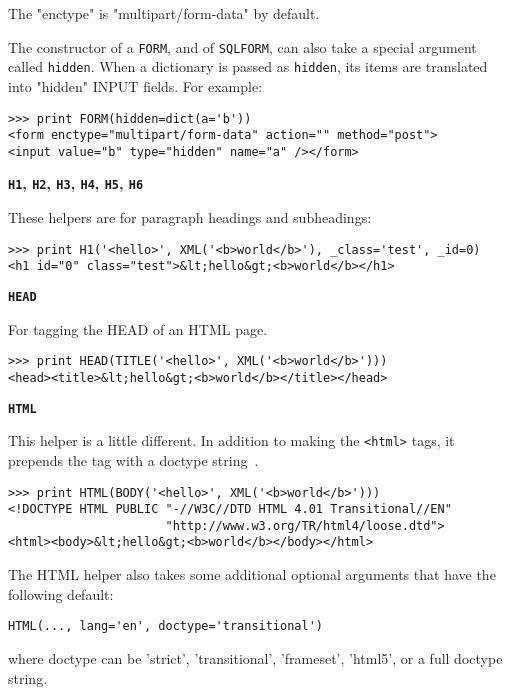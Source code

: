 \documentclass[justified,sixbynine,notoc]{tufte-book}
\def\ft{\small\tt}
\def\inxx#1{\index{#1}}
\begin{document}
\begin{fullwidth}
The "enctype" is "multipart/form-data" by default.

\inxx{hidden}
The constructor of a {\ft FORM}, and of {\ft SQLFORM}, can also take a special argument called {\ft hidden}. When a dictionary is passed as {\ft hidden}, its items are translated into "hidden" INPUT fields. For example:
\begin{lstlisting}
>>> print FORM(hidden=dict(a='b'))
<form enctype="multipart/form-data" action="" method="post">
<input value="b" type="hidden" name="a" /></form>
\end{lstlisting}

{\bf {\ft H1}, {\ft H2}, {\ft H3}, {\ft H4}, {\ft H5}, {\ft H6}}

\inxx{H1}

These helpers are for paragraph headings and subheadings:
\begin{lstlisting}
>>> print H1('<hello>', XML('<b>world</b>'), _class='test', _id=0)
<h1 id="0" class="test">&lt;hello&gt;<b>world</b></h1>
\end{lstlisting}

{\bf {\ft HEAD}}

For tagging the HEAD of an HTML page.

\inxx{HEAD}
\begin{lstlisting}
>>> print HEAD(TITLE('<hello>', XML('<b>world</b>')))
<head><title>&lt;hello&gt;<b>world</b></title></head>
\end{lstlisting}

{\bf {\ft HTML}}

\inxx{HTML} \inxx{XHTML}

This helper is a little different. In addition to making the {\ft <html>} tags,
it prepends the tag with a doctype string~\cite{xhtml-w,xhtml-o,xhtml-school}.
\begin{lstlisting}
>>> print HTML(BODY('<hello>', XML('<b>world</b>')))
<!DOCTYPE HTML PUBLIC "-//W3C//DTD HTML 4.01 Transitional//EN"
                      "http://www.w3.org/TR/html4/loose.dtd">
<html><body>&lt;hello&gt;<b>world</b></body></html>
\end{lstlisting}

The HTML helper also takes some additional optional arguments that have the following default:
\begin{lstlisting}
HTML(..., lang='en', doctype='transitional')
\end{lstlisting}
\noindent where doctype can be 'strict', 'transitional', 'frameset', 'html5', or a full doctype string.


\end{fullwidth}
\end{document}
